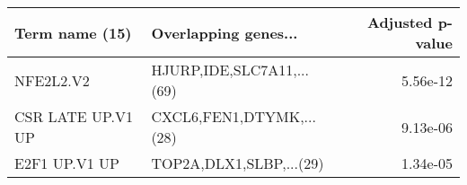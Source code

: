 \begin{tabular}{llr}
\toprule
   Term name (15) &      Overlapping genes... &  Adjusted p-value \\
\midrule
        NFE2L2.V2 & HJURP,IDE,SLC7A11,...(69) &          5.56e-12 \\
CSR LATE UP.V1 UP &  CXCL6,FEN1,DTYMK,...(28) &          9.13e-06 \\
    E2F1 UP.V1 UP &   TOP2A,DLX1,SLBP,...(29) &          1.34e-05 \\
\bottomrule
\end{tabular}
